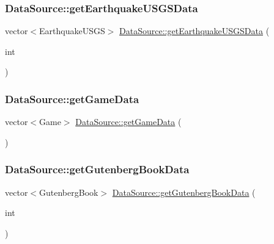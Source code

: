 \subsubsection{\texorpdfstring{Data\+Source\+::get\+Earthquake\+U\+S\+G\+S\+Data}{DataSource::getEarthquakeUSGSData}}
{\footnotesize\ttfamily vector$<$Earthquake\+U\+S\+GS$>$ \mbox{\hyperlink{namespacebridges_1_1_data_source_ae9f6a40dae8b8a15ebe43aca34931b43}{Data\+Source\+::get\+Earthquake\+U\+S\+G\+S\+Data}} (\begin{DoxyParamCaption}\item[{int}]{ }\end{DoxyParamCaption})\hspace{0.3cm}{\ttfamily [friend]}}

\mbox{\label{classbridges_1_1_server_comm_aaf9715981dcd976f93624bd3aa22183f}} 
\subsubsection{\texorpdfstring{Data\+Source\+::get\+Game\+Data}{DataSource::getGameData}}
{\footnotesize\ttfamily vector$<$Game$>$ \mbox{\hyperlink{namespacebridges_1_1_data_source_a96a28cc7f2a6013fe09b07cc53c7432f}{Data\+Source\+::get\+Game\+Data}} (\begin{DoxyParamCaption}{ }\end{DoxyParamCaption})\hspace{0.3cm}{\ttfamily [friend]}}

\mbox{\label{classbridges_1_1_server_comm_a8daad6bf2db8bf4f0b0f9914022b6aa4}} 
\subsubsection{\texorpdfstring{Data\+Source\+::get\+Gutenberg\+Book\+Data}{DataSource::getGutenbergBookData}\hspace{0.1cm}{\footnotesize\ttfamily [1/2]}}
{\footnotesize\ttfamily vector$<$Gutenberg\+Book$>$ \mbox{\hyperlink{namespacebridges_1_1_data_source_a8146b00565286727e8206e377d9ff5bd}{Data\+Source\+::get\+Gutenberg\+Book\+Data}} (\begin{DoxyParamCaption}\item[{int}]{ }\end{DoxyParamCaption})\hspace{0.3cm}{\ttfamily [friend]}}

